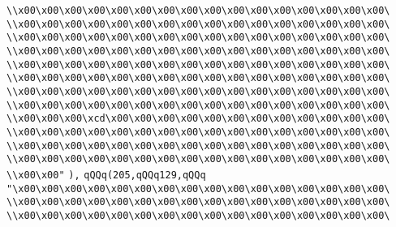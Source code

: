 \verb|\\x00\x00\x00\x00\x00\x00\x00\x00\x00\x00\x00\x00\x00\x00\x00\x00\|\newline
\verb|\\x00\x00\x00\x00\x00\x00\x00\x00\x00\x00\x00\x00\x00\x00\x00\x00\|\newline
\verb|\\x00\x00\x00\x00\x00\x00\x00\x00\x00\x00\x00\x00\x00\x00\x00\x00\|\newline
\verb|\\x00\x00\x00\x00\x00\x00\x00\x00\x00\x00\x00\x00\x00\x00\x00\x00\|\newline
\verb|\\x00\x00\x00\x00\x00\x00\x00\x00\x00\x00\x00\x00\x00\x00\x00\x00\|\newline
\verb|\\x00\x00\x00\x00\x00\x00\x00\x00\x00\x00\x00\x00\x00\x00\x00\x00\|\newline
\verb|\\x00\x00\x00\x00\x00\x00\x00\x00\x00\x00\x00\x00\x00\x00\x00\x00\|\newline
\verb|\\x00\x00\x00\x00\x00\x00\x00\x00\x00\x00\x00\x00\x00\x00\x00\x00\|\newline
\verb|\\x00\x00\x00\xcd\x00\x00\x00\x00\x00\x00\x00\x00\x00\x00\x00\x00\|\newline
\verb|\\x00\x00\x00\x00\x00\x00\x00\x00\x00\x00\x00\x00\x00\x00\x00\x00\|\newline
\verb|\\x00\x00\x00\x00\x00\x00\x00\x00\x00\x00\x00\x00\x00\x00\x00\x00\|\newline
\verb|\\x00\x00\x00\x00\x00\x00\x00\x00\x00\x00\x00\x00\x00\x00\x00\x00\|\newline
\verb|\\x00\x00"|\newline
\verb|),|\newline
\verb|qQQq(205,qQQq129,qQQq|\newline
\verb|"\x00\x00\x00\x00\x00\x00\x00\x00\x00\x00\x00\x00\x00\x00\x00\x00\|\newline
\verb|\\x00\x00\x00\x00\x00\x00\x00\x00\x00\x00\x00\x00\x00\x00\x00\x00\|\newline
\verb|\\x00\x00\x00\x00\x00\x00\x00\x00\x00\x00\x00\x00\x00\x00\x00\x00\|\newline
